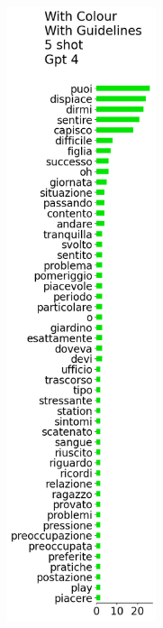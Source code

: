 \begin{figure}[!htbp]
\begin{subfigure}[t]{0.45\textwidth}
    \end{subfigure}
    \hspace{-1cm}
    \begin{subfigure}[t]{0.2\textwidth}
        \centering
        \captionsetup{width=.8\linewidth}%
        \includegraphics[height=18cm]{assets/imgs/tokens-vertical/token_distribution_with_color_with_guidelines_5_shot_gpt-4.png}
            \label{sub:persona-narrative-elicitation-comparison-distribution-gpt-4}
    \end{subfigure}

\end{figure}

